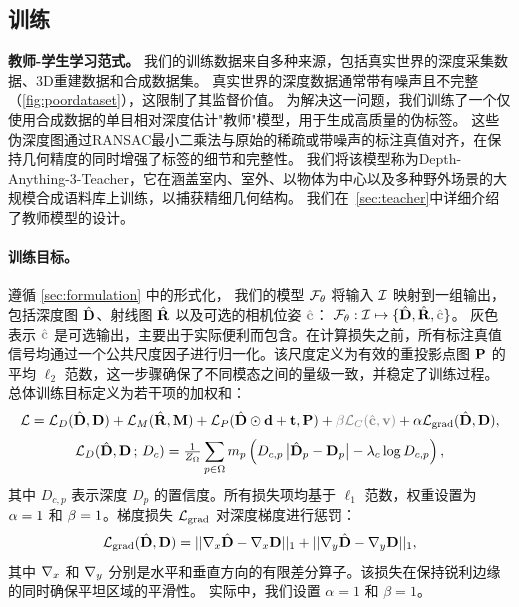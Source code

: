 \subsection{训练} \label{sec:training}


\textbf{教师-学生学习范式。}
我们的训练数据来自多种来源，包括真实世界的深度采集数据、3D重建数据和合成数据集。
真实世界的深度数据通常带有噪声且不完整（\cref{fig:poordataset}），这限制了其监督价值。
为解决这一问题，我们训练了一个仅使用合成数据的单目相对深度估计"教师"模型，用于生成高质量的伪标签。
这些伪深度图通过RANSAC最小二乘法与原始的稀疏或带噪声的标注真值对齐，在保持几何精度的同时增强了标签的细节和完整性。
我们将该模型称为Depth-Anything-3-Teacher，它在涵盖室内、室外、以物体为中心以及多种野外场景的大规模合成语料库上训练，以捕获精细几何结构。
我们在~\cref{sec:teacher}中详细介绍了教师模型的设计。



\newcommand{\errd}{e^{\mathrm{D}}}
\newcommand{\nz}{Z_{\Omega}}

\paragraph{训练目标。}
遵循 \cref{sec:formulation} 中的形式化，
我们的模型 $\mathcal{F}_\theta$ 将输入 $\mathcal{I}$ 映射到一组输出，包括深度图 $\hat{\mathbf{D}}$、射线图 $\hat{\mathbf{R}}$ 以及可选的相机位姿 $\textcolor{gray}{\predcamera}$：
$\model: \inputset \mapsto \{\preddepth, \predray, \textcolor{gray}{\predcamera}\}$。
灰色表示 $\textcolor{gray}{\predcamera}$ 是可选输出，主要出于实际便利而包含。在计算损失之前，所有标注真值信号均通过一个公共尺度因子进行归一化。该尺度定义为有效的重投影点图 $\mathbf{P}$ 的平均 $\ell_{2}$ 范数，这一步骤确保了不同模态之间的量级一致，并稳定了训练过程。总体训练目标定义为若干项的加权和：
\begin{equation*}
\totalloss = \depthloss(\preddepth, \depthmap) + \rayloss(\predray, \raymap) + \pointloss(\preddepth \odot \raydir + \rayorigin, \worldpoint) + \textcolor{gray}{\cameraweight \cameraloss (\predcamera, \cameravec)}
+ \gradweight \gradloss(\preddepth, \depthmap),
\label{eq:loss}
\end{equation*}
\begin{equation*}
    \depthloss(\preddepth, \depthmap \,;\, D_c)
    = \tfrac{1}{\nz} \sum_{p \in \Omega} m_p \left( D_{c,p}\, \big|\preddepth_p - \depthmap_p\big| - \lambda_c \log D_{c,p} \right),
\end{equation*}
其中 $D_{c,p}$ 表示深度 $D_p$ 的置信度。所有损失项均基于 $\ell_{1}$ 范数，权重设置为 $\alpha=1$ 和 $\beta=1$。梯度损失 $\mathcal{L}_\text{grad}$ 对深度梯度进行惩罚：
\begin{equation}
\mathcal{L}_\text{grad}(\hat{\mathbf{D}}, \mathbf{D}) = ||\nabla_x \hat{\mathbf{D}} - \nabla_x \mathbf{D}||_{1} + ||\nabla_y \hat{\mathbf{D}} - \nabla_y \mathbf{D}||_{1},
\end{equation}
其中 $\nabla_x$ 和 $\nabla_y$ 分别是水平和垂直方向的有限差分算子。该损失在保持锐利边缘的同时确保平坦区域的平滑性。
实际中，我们设置 $\alpha=1$ 和 $\beta = 1$。

